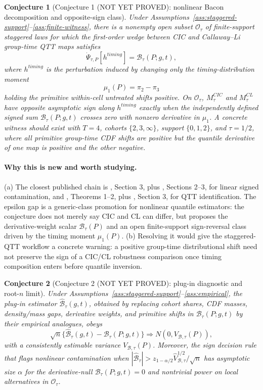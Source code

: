 \documentclass[11pt]{article}
\theoremstyle{definition}
\theoremstyle{plain}
\newtheorem{conjecture}{Conjecture}
\theoremstyle{remark}
\begin{document}
\begin{conjecture}[Conjecture 1 (NOT YET PROVED): nonlinear Bacon decomposition and opposite-sign class]\label{conj:if-bacon}
Under Assumptions~\ref{ass:staggered-support}--\ref{ass:finite-witness}, there is a nonempty open subset \(\mathcal O_\tau\) of finite-support staggered laws for which the first-order wedge between CIC and Callaway--Li group-time QTT maps satisfies
\[
\dot\Psi_{\tau,P}[h^{timing}]
=\mathcal B_\tau(P;g,t),
\]
where \(h^{timing}\) is the perturbation induced by changing only the timing-distribution moment
\[
\mu_1(P)=\pi_2-\pi_3
\]
holding the primitive within-cell untreated shifts positive.  On \(\mathcal O_\tau\), \(M_\tau^{CIC}\) and \(M_\tau^{CL}\) have opposite asymptotic sign along \(h^{timing}\) exactly when the independently defined signed sum \(\mathcal B_\tau(P;g,t)\) crosses zero with nonzero derivative in \(\mu_1\).  A concrete witness should exist with \(T=4\), cohorts \(\{2,3,\infty\}\), support \(\{0,1,2\}\), and \(\tau=1/2\), where all primitive group-time CDF shifts are positive but the quantile derivative of one map is positive and the other negative.
\end{conjecture}
\paragraph{Why this is new and worth studying.}
(a) The closest published chain is \citet{GoodmanBacon2021}, Section 3, plus \citet{SunAbraham2021}, Sections 2--3, for linear signed contamination, and \citet{CallawayLi2019}, Theorems 1--2, plus \citet{LiLin2024}, Section 3, for QTT identification.  The epsilon gap is a generic-class promotion for nonlinear quantile estimators: the conjecture does not merely say CIC and CL can differ, but proposes the derivative-weight scalar \(\mathcal B_\tau(P)\) and an open finite-support sign-reversal class driven by the timing moment \(\mu_1(P)\).  (b) Resolving it would give the \citet{LiLin2024} staggered-QTT workflow a concrete warning: a positive group-time distributional shift need not preserve the sign of a CIC/CL robustness comparison once timing composition enters before quantile inversion.

\begin{conjecture}[Conjecture 2 (NOT YET PROVED): plug-in diagnostic and root-\(n\) limit]\label{conj:estimator}
Under Assumptions~\ref{ass:staggered-support}--\ref{ass:empirical}, the plug-in estimator \(\widehat{\mathcal B}_\tau(g,t)\), obtained by replacing cohort shares, CDF masses, density/mass gaps, derivative weights, and primitive shifts in \(\mathcal B_\tau(P;g,t)\) by their empirical analogues, obeys
\[
\sqrt n\{\widehat{\mathcal B}_\tau(g,t)-\mathcal B_\tau(P;g,t)\}
\Rightarrow N(0,V_{\mathcal B,\tau}(P)),
\]
with a consistently estimable variance \(V_{\mathcal B,\tau}(P)\).  Moreover, the sign decision rule that flags nonlinear contamination when \(|\widehat{\mathcal B}_\tau|>z_{1-\alpha/2}\widehat V_{\mathcal B,\tau}^{1/2}/\sqrt n\) has asymptotic size \(\alpha\) for the derivative-null \(\mathcal B_\tau(P;g,t)=0\) and nontrivial power on local alternatives in \(\mathcal O_\tau\).
\end{conjecture}
\end{document}
